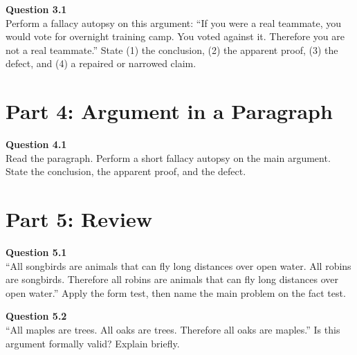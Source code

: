 \documentclass[12pt]{article}
\begin{document}
\textbf{Question 3.1}\\[-0.15em]
Perform a fallacy autopsy on this argument: ``If you were a real teammate, you would vote for overnight training camp. You voted against it. Therefore you are not a real teammate.'' State (1) the conclusion, (2) the apparent proof, (3) the defect, and (4) a repaired or narrowed claim.


\newpage

\section*{Part 4: Argument in a Paragraph}

\textbf{Question 4.1}\\[-0.15em]
Read the paragraph. Perform a short fallacy autopsy on the main argument. State the conclusion, the apparent proof, and the defect.

\vspace{0.2em}

\noindent{}


\newpage

\section*{Part 5: Review}

\textbf{Question 5.1}\\[-0.15em]
``All songbirds are animals that can fly long distances over open water. All robins are songbirds. Therefore all robins are animals that can fly long distances over open water.'' Apply the form test, then name the main problem on the fact test.


\textbf{Question 5.2}\\[-0.15em]
``All maples are trees. All oaks are trees. Therefore all oaks are maples.'' Is this argument formally valid? Explain briefly.

\end{document}
